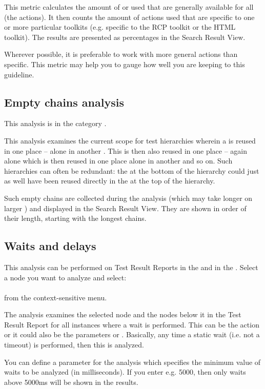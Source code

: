 This metric calculates the amount of \gdcases{} or \gdsteps{} used that are generally available for all  (the  actions). It then counts the amount of actions used that are specific to one or more particular toolkits (e.g. specific to the RCP toolkit or the HTML toolkit). The results are presented as percentages in the Search Result View.

Wherever possible, it is preferable to work with more general actions than specific. This metric may help you to gauge how well you are keeping to this guideline. 

\subsection{Empty chains analysis}
This analysis is in the category .

This analysis examines the current scope for test hierarchies wherein a \gdcase{} is reused in one place --  alone in another \gdcase{}. This \gdcase{} is then also reused in one place -- again alone  which is then reused in one place alone in another \gdcase{} and so on. Such hierarchies can often be redundant: the \gdcase{} at the bottom of the hierarchy could just as well have been reused directly in the \gdcase{} at the top of the hierarchy. 

Such empty chains are collected during the analysis (which may take longer on larger \gdprojects{}) and displayed in the Search Result View. They are shown in order of their length, starting with the longest chains.

\subsection{Waits and delays}
This analysis can be performed on Test Result Reports in the \execpersp{} and in the \reportpersp{}. Select a node you want to analyze and select:\\
\\
from the context-sensitive menu.

The analysis examines the selected node and the nodes below it in the Test Result Report for all instances where a wait is performed. This can be the action  or it could also be the parameters  or . Basically, any time a static wait (i.e. not a timeout) is performed, then this is analyzed.

You can define a parameter for the analysis which specifies the minimum value of waits to be analyzed (in milliseconds). If you enter e.g. 5000, then only waits above 5000ms will be shown in the results.

